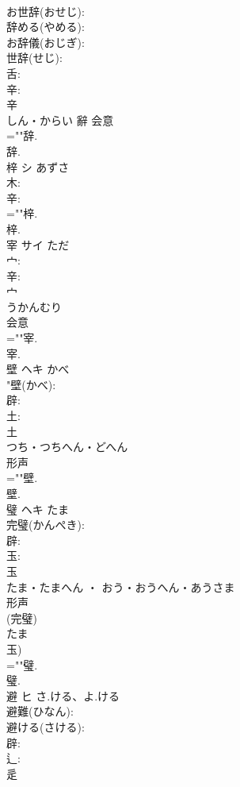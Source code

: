 \documentclass[8pt]{extreport}
\begin{document}
\begin{CJK}{UTF8}{min}
\\	お世辞(おせじ): 
\\	辞める(やめる): 
\\	お辞儀(おじぎ): 
\\	世辞(せじ): 
\\	舌: 
\\	辛: 
\\	辛	
\\	しん・からい	辭	会意 
\\	=""辞.
\\	辞.
\\	梓	シ	あずさ		
\\	木: 
\\	辛: 
\\	=""梓.
\\	梓.
\\	宰	サイ		ただ	
\\	宀: 
\\	辛: 
\\	宀	
\\	うかんむり	
\\	会意 
\\	=""宰.
\\	宰.
\\	壁	ヘキ	かべ		
\\	"壁(かべ): 
\\	辟: 
\\	土: 
\\	土	
\\	つち・つちへん・どへん	
\\	形声 
\\	=""壁.
\\	壁.
\\	璧	ヘキ	たま		
\\	完璧(かんぺき): 
\\	辟: 
\\	玉: 
\\	玉	
\\	たま・たまへん ・ おう・おうへん・あうさま	
\\	形声 
\\	(完璧) 
\\	たま 
\\	玉) 
\\	=""璧.
\\	璧.
\\	避	ヒ	さ.ける、よ.ける		
\\	避難(ひなん): 
\\	避ける(さける): 
\\	辟: 
\\	辶: 
\\	辵	

\end{CJK}
\end{document}
